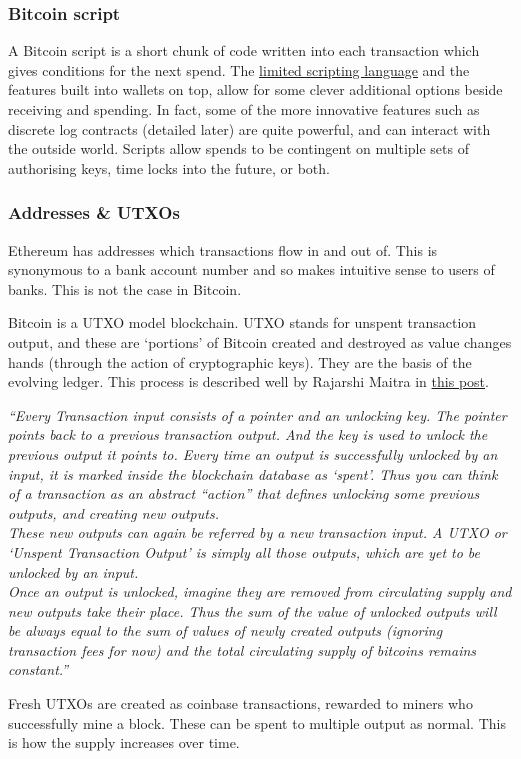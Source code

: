 \subsubsection{Bitcoin script}
A Bitcoin script is a short chunk of code written into each transaction which gives conditions for the next spend. The \href{https://bitcoin.sipa.be/miniscript/}{limited scripting language} and the features built into wallets on top, allow for some clever additional options beside receiving and spending. In fact, some of the more innovative features such as discrete log contracts (detailed later) are quite powerful, and can interact with the outside world. Scripts allow spends to be contingent on multiple sets of authorising keys, time locks into the future, or both.\par
\subsubsection{Addresses \& UTXOs}
Ethereum has addresses which transactions flow in and out of. This is synonymous to a bank account number and so makes intuitive sense to users of banks. This is not the case in Bitcoin.\par
Bitcoin is a UTXO model blockchain. UTXO stands for unspent transaction output, and these are `portions' of Bitcoin created and destroyed as value changes hands (through the action of cryptographic keys). They are the basis of the evolving ledger. This process is described well by Rajarshi Maitra in \href{https://medium.com/bitbees/what-the-heck-is-utxo-ca68f2651819}{this post}.\par
\textit{``Every Transaction input consists of a pointer and an unlocking key. The pointer points back to a previous transaction output. And the key is used to unlock the previous output it points to. Every time an output is successfully unlocked by an input, it is marked inside the blockchain database as `spent'. Thus you can think of a transaction as an abstract “action” that defines unlocking some previous outputs, and creating new outputs.\\
These new outputs can again be referred by a new transaction input. A UTXO or `Unspent Transaction Output' is simply all those outputs, which are yet to be unlocked by an input.\\
Once an output is unlocked, imagine they are removed from circulating supply and new outputs take their place. Thus the sum of the value of unlocked outputs will be always equal to the sum of values of newly created outputs (ignoring transaction fees for now) and the total circulating supply of bitcoins remains constant.''}\par
Fresh UTXOs are created as coinbase transactions, rewarded to miners who successfully mine a block. These can be spent to multiple output as normal. This is how the supply increases over time.
